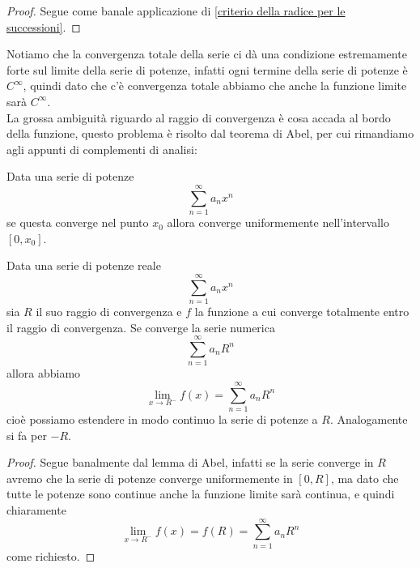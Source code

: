 \documentclass[11pt]{scrartcl}
\begin{document}
	\begin{proof}
		Segue come banale applicazione di \ref{criterio della radice per le successioni}.
	\end{proof}
	Notiamo che la convergenza totale della serie ci dà una condizione estremamente forte sul limite della serie di potenze, infatti ogni termine della serie di potenze è $C^\infty$, quindi dato che c'è convergenza totale abbiamo che anche la funzione limite sarà $C^\infty$. \\
	La grossa ambiguità riguardo al raggio di convergenza è cosa accada al bordo della funzione, questo problema è risolto dal teorema di Abel, per cui rimandiamo agli appunti di complementi di analisi:
	\begin{theorem}[Abel]
		Data una serie di potenze
		$$\sum_{n=1}^\infty a_nx^n$$
		se questa converge nel punto $x_0$ allora converge uniformemente nell'intervallo $[0,x_0]$.
	\end{theorem}
	\begin{corollary}[Abel]
		Data una serie di potenze reale
		$$\sum_{n=1}^{\infty}a_nx^n$$
		sia $R$ il suo raggio di convergenza e $f$ la funzione a cui converge totalmente entro il raggio di convergenza. Se converge la serie numerica
		$$\sum_{n=1}^{\infty}a_nR^n$$
		allora abbiamo
		$$\lim_{x\to R^-}f(x)=\sum_{n=1}^{\infty}a_nR^n$$
		cioè possiamo estendere in modo continuo la serie di potenze a $R$. Analogamente si fa per $-R$.
	\end{corollary}
	\begin{proof}
		Segue banalmente dal lemma di Abel, infatti se la serie converge in $R$ avremo che la serie di potenze converge uniformemente in $[0,R]$, ma dato che tutte le potenze sono continue anche la funzione limite sarà continua, e quindi chiaramente 
		$$\lim_{x\to R^-}f(x)=f(R)=\sum_{n=1}^{\infty}a_nR^n$$
		come richiesto.
	\end{proof}
\end{document}

